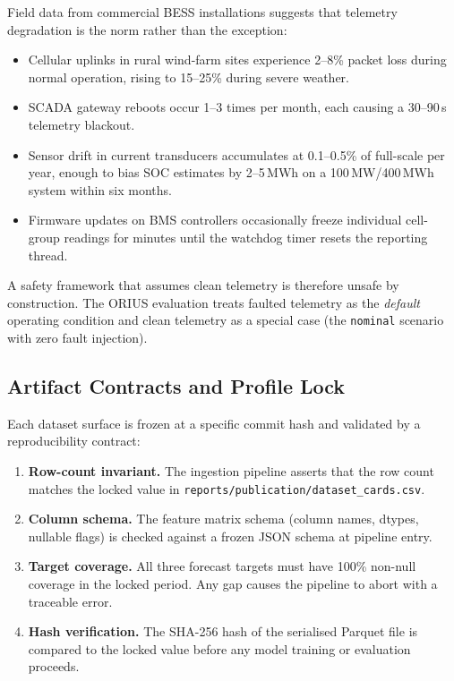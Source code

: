 Field data from commercial BESS installations suggests that telemetry
degradation is the norm rather than the exception:

\begin{itemize}
  \item Cellular uplinks in rural wind-farm sites experience 2--8\% packet
    loss during normal operation, rising to 15--25\% during severe weather.
  \item SCADA gateway reboots occur 1--3 times per month, each causing a
    30--90\,s telemetry blackout.
  \item Sensor drift in current transducers accumulates at 0.1--0.5\% of
    full-scale per year, enough to bias SOC estimates by 2--5\,MWh on a
    100\,MW/400\,MWh system within six months.
  \item Firmware updates on BMS controllers occasionally freeze individual
    cell-group readings for minutes until the watchdog timer resets the
    reporting thread.
\end{itemize}

A safety framework that assumes clean telemetry is therefore unsafe by
construction.  The ORIUS evaluation treats faulted telemetry as the
\emph{default} operating condition and clean telemetry as a special case
(the \texttt{nominal} scenario with zero fault injection).

\subsection{Artifact Contracts and Profile Lock}

Each dataset surface is frozen at a specific commit hash and validated by a
reproducibility contract:

\begin{enumerate}
  \item \textbf{Row-count invariant.}  The ingestion pipeline asserts that
    the row count matches the locked value in
    \texttt{reports/publication/dataset\_cards.csv}.
  \item \textbf{Column schema.}  The feature matrix schema (column names,
    dtypes, nullable flags) is checked against a frozen JSON schema at
    pipeline entry.
  \item \textbf{Target coverage.}  All three forecast targets must have
    100\% non-null coverage in the locked period.  Any gap causes the pipeline
    to abort with a traceable error.
  \item \textbf{Hash verification.}  The SHA-256 hash of the serialised
    Parquet file is compared to the locked value before any model training or
    evaluation proceeds.
\end{enumerate}

